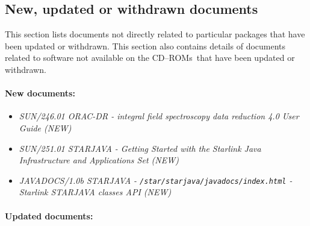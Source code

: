 \documentclass[twoside,11pt]{article}
\newcommand{\xref}[3]{#1}
\renewcommand{\_}{\texttt{\symbol{95}}}
\newcommand{\cdroms}{CD--ROMs}
\newcommand{\cdroms}{CD-ROMs}
\begin{document}
\subsection{New, updated or withdrawn documents}

This section lists documents not directly related to particular packages that
have been updated or withdrawn.  This section also contains details of documents
related to software not available on the \cdroms\ that have been updated
or withdrawn.

\paragraph{New documents:}


\begin{itemize}
\item \textit{\xref{SUN/246.01 ORAC-DR - integral field spectroscopy data
reduction 4.0 User Guide (NEW)}{sun246}{}\/}

\item \textit{\xref{SUN/251.01 STARJAVA - Getting Started with the Starlink Java
Infrastructure and Applications Set (NEW)}{sun251}{}\/}

\item \textit{JAVADOCS/1.0b STARJAVA - \texttt{/star/starjava/javadocs/index.html} -\\
Starlink STARJAVA classes API (NEW)}

\end{itemize}


\paragraph{Updated documents:}
\end{document}
